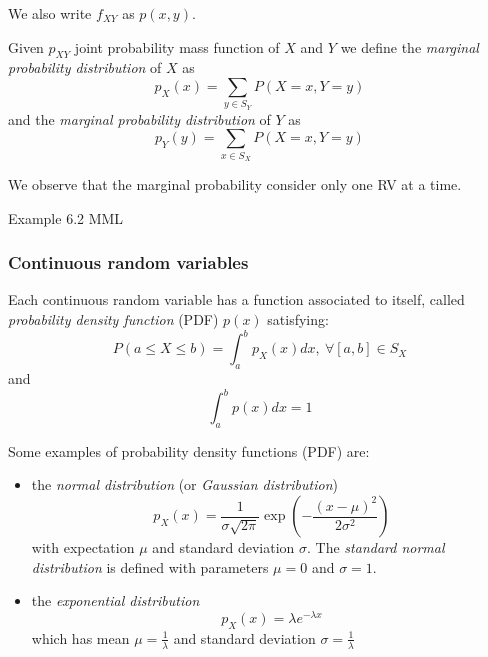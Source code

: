 We also write $f_{XY}$ as $p(x,y)$.
\begin{definition}
    Given $p_{XY}$ joint probability mass function of $X$ and $Y$ we define the \textit{marginal probability distribution} of $X$ as
    $$ p_X(x) = \sum_{y \in S_Y}{P(X = x, Y = y)} $$
    and the \textit{marginal probability distribution} of $Y$ as
    $$ p_Y(y) = \sum_{x \in S_X}{P(X = x, Y = y)} $$
\end{definition}

We observe that the marginal probability consider only one  RV at a time.

Example 6.2 MML

\subsubsection{Continuous random variables}

Each continuous  random variable has a function associated to itself, called \textit{probability density function} (PDF) $p(x)$ satisfying:
$$ P(a \leq X \leq b) = \int_{a}^{b}{p_X(x)dx},\ \forall[a, b] \in S_X $$
and 
$$\int_a^b p(x)dx=1$$




Some examples of probability density  functions (PDF) are:

\begin{itemize}
    \item the \textit{normal distribution} (or \textit{Gaussian distribution})
    $$ p_X(x) = \frac{1}{\sigma\sqrt{2\pi}}\exp{\left(-\frac{(x-\mu)^2}{2\sigma^2}\right)} $$
    with expectation $\mu$ and standard deviation $\sigma$. The \textit{standard normal distribution} is defined with parameters $\mu = 0$ and $\sigma = 1$.
    \item the \textit{exponential distribution}
    $$ p_X(x) = \lambda e^{-\lambda x} $$
    which has mean $\mu = \frac{1}{\lambda}$ and standard deviation $\sigma = \frac{1}{\lambda}$
\end{itemize}


